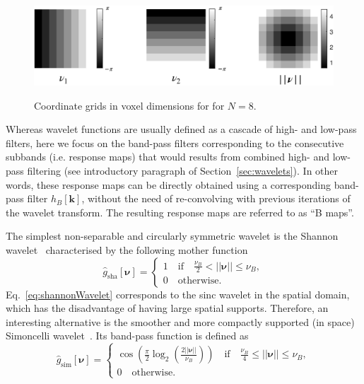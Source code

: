 \documentclass[fleqn,a4paper,oneside,openany]{book}
\begin{document}
%
\begin{figure}
\centering
\includegraphics[trim = 0 0 0 0, clip, width=.8\linewidth]{coordinateGridsFourier.png}\\
\caption{Coordinate grids in voxel dimensions for for $N=8$.}
  \label{fig:coordinateGridsFourier}
\end{figure}
%

Whereas wavelet functions are usually defined as a cascade of high- and low-pass filters, here we focus on the band-pass filters corresponding to the consecutive subbands (i.e. response maps) that would results from combined high- and low- pass filtering (see introductory paragraph of Section~\ref{sec:wavelets}). In other words, these response maps can be directly obtained using a corresponding band-pass filter $h_B[\boldsymbol{k}]$, without the need of re-convolving with previous iterations of the wavelet transform. The resulting response maps are referred to as ``B maps''.

The simplest non-separable and circularly symmetric wavelet is the Shannon wavelet~\cite{UCV2011} characterised by the following mother function
%
\begin{equation}\label{eq:shannonWavelet}
\hat{g}_{\text{sha}}[\boldsymbol{\nu}]=
\begin{cases}
1\quad\text{if}\quad\frac{\nu_B}{2}< ||\boldsymbol{\nu}|| \leq \nu_B,\\
0\quad\text{otherwise}.
\end{cases}
\end{equation}
%
Eq.~\eqref{eq:shannonWavelet} corresponds to the sinc wavelet in the spatial domain, which has the disadvantage of having large spatial supports. Therefore, an interesting alternative is the smoother and more compactly supported (in space) Simoncelli wavelet~\cite{PoS2000}. Its band-pass function is defined as
%
\begin{equation}\label{eq:simoncelliWavelet}
\hat{g}_{\text{sim}}[\boldsymbol{\nu}]=
\begin{cases}
\cos\left(\frac{\pi}{2}\log_2\left(\frac{2||\boldsymbol{\nu}||}{\nu_B}\right)\right)\quad\text{if}\quad\frac{\nu_B}{4}\leq ||\boldsymbol{\nu}|| \leq \nu_B,\\
0\quad\text{otherwise}.
\end{cases}
\end{equation}
%
\end{document}
